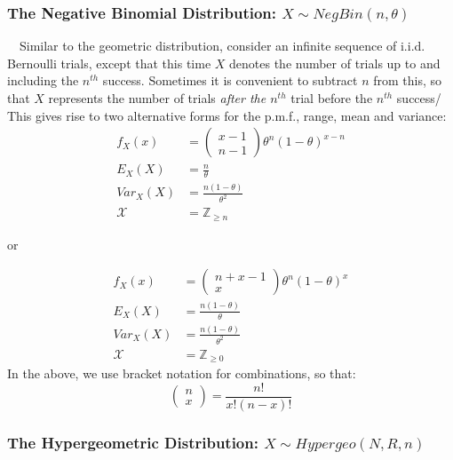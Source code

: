 \documentclass[12pt,a4paper]{article}
\begin{document}
\subsubsection{The Negative Binomial Distribution: $ X \sim NegBin(n,\theta)$}

$\quad$Similar to the geometric distribution, consider an infinite sequence of i.i.d. Bernoulli trials, except that this time $X$ denotes the number of trials up to and including the $n^{th}$ success. Sometimes it is convenient to subtract $n$ from this, so that $X$ represents the number of trials \emph{after the $n^{th}$} trial before the $n^{th}$ success/ This gives rise to two alternative forms for the p.m.f., range, mean and variance:
\begin{align*}
f_X(x) &= \left(\!\!\!\begin{array}{c} x-1 \\ n-1 \end{array}\!\!\!\right) \theta^n (1-\theta)^{x-n}\\
E_{X}(X) &= \frac{n}{\theta}\\
Var_{X}(X) &= \frac{n(1-\theta)}{\theta^2}\\
\mathcal{X} &= \mathbb{Z}_{\geq n}
\end{align*}

\begin{center} or \end{center}
\begin{align*}
f_X(x) &= \left(\!\!\!\begin{array}{c} n+x-1 \\ x \end{array}\!\!\!\right) \theta^n (1-\theta)^x\\
E_{X}(X) &= \frac{n(1-\theta)}{\theta}\\
Var _{X}(X) &= \frac{n(1-\theta)}{\theta^2}\\
\mathcal{X} &= \mathbb{Z}_{\geq 0}
\end{align*}
In the above, we use bracket notation for combinations, so that:
$$\left(\!\!\!\begin{array}{c} n\\x\end{array}\!\!\!\right) = \frac{n!}{x! (n-x)!}$$

\subsubsection{The Hypergeometric Distribution: $X \sim Hypergeo(N,R,n)$}
\end{document}
